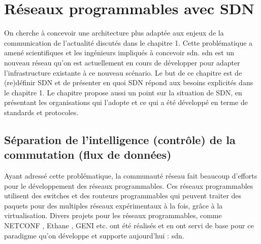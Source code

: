 \chapter{Réseaux programmables avec SDN}

On cherche à concevoir une architecture plus adaptée aux enjeux de la communication de l'actualité discutés dans le chapitre 1. Cette problématique a amené scientifiques et les ingénieurs impliqués à concevoir \gls{sdn}. \gls{sdn} est un nouveau  réseau qu'on est actuellement en cours de développer pour adapter l'infrastructure existante à ce nouveau scénario.
Le but de ce chapitre est de (re)définir SDN et de présenter en quoi SDN répond aux besoins explicités dans le chapitre 1.
Le chapitre propose aussi un point sur la situation de SDN, en présentant les organisations qui l'adopte et ce qui a été développé en terme de standards et protocoles.

\section{Séparation de l'intelligence (contrôle) de la commutation (flux de données)}

Ayant adressé cette problématique, la communauté réseau fait beaucoup d'efforts pour le développement des réseaux programmables. Ces réseaux programmables utilisent des switches et des routeurs programmables qui peuvent traiter des paquets pour des multiples réseaux expérimentaux  à la fois, grâce à la \gls{virtualisation}. \cite{OpenFlowStanfordOssification} Divers projets pour les réseaux programmables, comme NETCONF \cite{NETCONF}, Ethane \cite{Ethane}, GENI \cite{GENI} etc. ont été réalisés et en ont servi de base pour ce paradigme qu'on développe et supporte aujourd'hui : \gls{sdn}. 



